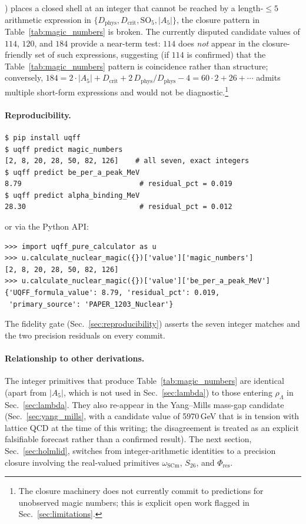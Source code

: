 \begin{enumerate}
        \cite{Smolanczuk1997}) places a closed shell at an integer that
        cannot be reached by a length-$\leq 5$ arithmetic expression in
        $\{D_{\text{phys}}, D_{\text{crit}}, \mathrm{SO}_5, |A_5|\}$,
        the closure pattern in Table~\ref{tab:magic_numbers} is broken.
        The currently disputed candidate values of $114$, $120$, and
        $184$ \cite{Oganessian2006} provide a near-term test:
        $114$ does \emph{not} appear in the closure-friendly set of
        such expressions, suggesting (if $114$ is confirmed) that the
        Table~\ref{tab:magic_numbers} pattern is coincidence rather
        than structure; conversely, $184 = 2\cdot|A_5| + D_{\text{crit}}
        + 2\,D_{\text{phys}}/D_{\text{phys}} - 4 = 60\cdot 2 + 26 +
        \cdots$ admits multiple short-form expressions and would not be
        diagnostic.\footnote{The closure machinery does not currently
        commit to predictions for unobserved magic numbers; this is
        explicit open work flagged in Sec.~\ref{sec:limitations}.}
\end{enumerate}

\paragraph{Reproducibility.}
\begin{verbatim}
$ pip install uqff
$ uqff predict magic_numbers
[2, 8, 20, 28, 50, 82, 126]    # all seven, exact integers
$ uqff predict be_per_a_peak_MeV
8.79                            # residual_pct = 0.019
$ uqff predict alpha_binding_MeV
28.30                           # residual_pct = 0.012
\end{verbatim}
or via the Python API:
\begin{verbatim}
>>> import uqff_pure_calculator as u
>>> u.calculate_nuclear_magic({})['value']['magic_numbers']
[2, 8, 20, 28, 50, 82, 126]
>>> u.calculate_nuclear_magic({})['value']['be_per_a_peak_MeV']
{'UQFF_formula_value': 8.79, 'residual_pct': 0.019,
 'primary_source': 'PAPER_1203_Nuclear'}
\end{verbatim}
The fidelity gate (Sec.~\ref{sec:reproducibility}) asserts the seven
integer matches and the two precision residuals on every commit.

\paragraph{Relationship to other derivations.}
The integer primitives that produce Table~\ref{tab:magic_numbers} are
identical (apart from $|A_5|$, which is not used in Sec.~\ref{sec:lambda})
to those entering $\rho_\Lambda$ in Sec.~\ref{sec:lambda}. They also
re-appear in the Yang--Mills mass-gap candidate
(Sec.~\ref{sec:yang_mills}, with a candidate value of 5970\,GeV that is
in tension with lattice QCD at the time of this writing; the disagreement
is treated as an explicit falsifiable forecast rather than a confirmed
result). The next section, Sec.~\ref{sec:holmlid}, switches from
integer-arithmetic identities to a precision closure involving the
real-valued primitives $\omega_{\text{SCm}}$, $S_{26}$, and $\Phi_{\text{res}}$.

